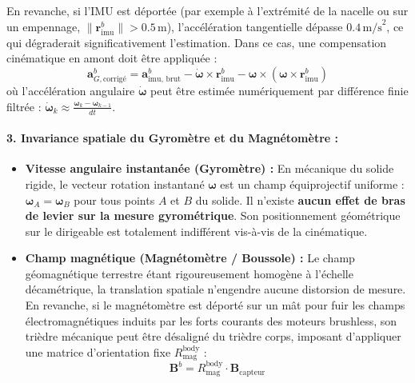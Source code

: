 \documentclass[../Formulations_Kalman.tex]{subfiles}
\begin{document}
En revanche, si l'IMU est déportée (par exemple à l'extrémité de la nacelle ou sur un empennage, $\|\mathbf{r}_{\text{imu}}^b\| > 0.5\,\text{m}$), l'accélération tangentielle dépasse $0.4\,\text{m/s}^2$, ce qui dégraderait significativement l'estimation. Dans ce cas, une compensation cinématique en amont doit être appliquée :
\begin{equation}
\mathbf{a}_{G,\text{corrigé}}^b = \mathbf{a}_{\text{imu, brut}}^b - \dot{\boldsymbol{\omega}} \times \mathbf{r}_{\text{imu}}^b - \boldsymbol{\omega} \times (\boldsymbol{\omega} \times \mathbf{r}_{\text{imu}}^b)
\end{equation}
où l'accélération angulaire $\dot{\boldsymbol{\omega}}$ peut être estimée numériquement par différence finie filtrée : $\dot{\boldsymbol{\omega}}_k \approx \frac{\boldsymbol{\omega}_k - \boldsymbol{\omega}_{k-1}}{dt}$.

\paragraph{3. Invariance spatiale du Gyromètre et du Magnétomètre :}
\begin{itemize}
    \item \textbf{Vitesse angulaire instantanée (Gyromètre) :} En mécanique du solide rigide, le vecteur rotation instantané $\boldsymbol{\omega}$ est un champ équiprojectif uniforme : $\boldsymbol{\omega}_A = \boldsymbol{\omega}_B$ pour tous points $A$ et $B$ du solide. Il n'existe \textbf{aucun effet de bras de levier sur la mesure gyrométrique}. Son positionnement géométrique sur le dirigeable est totalement indifférent vis-à-vis de la cinématique.
    \item \textbf{Champ magnétique (Magnétomètre / Boussole) :} Le champ géomagnétique terrestre étant rigoureusement homogène à l'échelle décamétrique, la translation spatiale n'engendre aucune distorsion de mesure. En revanche, si le magnétomètre est déporté sur un mât pour fuir les champs électromagnétiques induits par les forts courants des moteurs brushless, son trièdre mécanique peut être désaligné du trièdre corps, imposant d'appliquer une matrice d'orientation fixe $R_{\text{mag}}^{\text{body}}$ :
    \begin{equation}
    \mathbf{B}^b = R_{\text{mag}}^{\text{body}} \cdot \mathbf{B}_{\text{capteur}}
    \end{equation}
\end{itemize}
\end{document}
